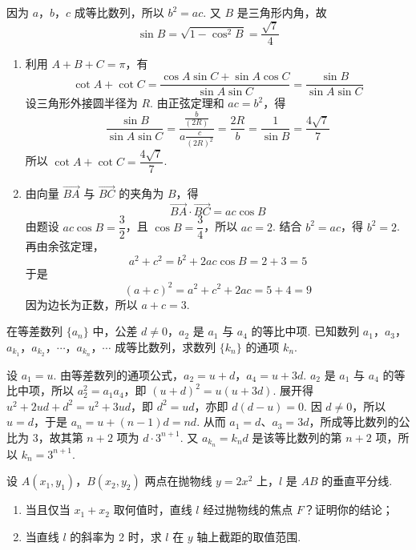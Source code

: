 \begin{solution}
因为 \(a\)，\(b\)，\(c\) 成等比数列，所以 \(b^{2}=ac\). 又 \(B\) 是三角形内角，故
\[
\sin B=\sqrt{1-\cos^{2}B}=\dfrac{\sqrt{7}}{4}
\]

\begin{enumerate}
\item 利用 \(A+B+C=\pi\)，有
\[
\cot A+\cot C=\frac{\cos A\sin C+\sin A\cos C}{\sin A\sin C}=\frac{\sin B}{\sin A\sin C}
\]
设三角形外接圆半径为 \(R\). 由正弦定理和 \(ac=b^{2}\)，得
\[
\frac{\sin B}{\sin A\sin C}
=\frac{\frac{b}{(2R)}}{a\frac{c}{(2R)^{2}}}
=\frac{2R}{b}
=\frac{1}{\sin B}
=\frac{4\sqrt{7}}{7}
\]
所以 \(\cot A+\cot C=\dfrac{4\sqrt{7}}{7}\).

\item 由向量 \(\overrightarrow{BA}\) 与 \(\overrightarrow{BC}\) 的夹角为 \(B\)，得
\[
\overrightarrow{BA}\cdot\overrightarrow{BC}=ac\cos B
\]
由题设 \(ac\cos B=\dfrac32\)，且 \(\cos B=\dfrac34\)，所以 \(ac=2\). 结合 \(b^{2}=ac\)，得 \(b^{2}=2\). 再由余弦定理，
\[
a^{2}+c^{2}=b^{2}+2ac\cos B=2+3=5
\]
于是
\[
(a+c)^{2}=a^{2}+c^{2}+2ac=5+4=9
\]
因为边长为正数，所以 \(a+c=3\).
\end{enumerate}
\end{solution}

\begin{problem}
在等差数列 \(\{a_{n}\}\) 中，公差 \(d \neq 0\)，\(a_{2}\) 是 \(a_{1}\) 与 \(a_{4}\) 的等比中项. 已知数列 \(a_{1}\)，\(a_{3}\)，\(a_{k_1}\)，\(a_{k_2}\)，\(\cdots\)，\(a_{k_n}\)，\(\cdots\) 成等比数列，求数列 \(\{k_{n}\}\) 的通项 \(k_{n}\).
\end{problem}

\begin{solution}
设 \(a_{1}=u\). 由等差数列的通项公式，\(a_{2}=u+d\)，\(a_{4}=u+3d\). \(a_2\) 是 \(a_1\) 与 \(a_4\) 的等比中项，所以 \(a_2^2=a_1a_4\)，即 \((u+d)^2=u(u+3d)\). 展开得 \(u^2+2ud+d^2=u^2+3ud\)，即 \(d^2=ud\)，亦即 \(d(d-u)=0\). 因 \(d\ne0\)，所以 \(u=d\)，于是 \(a_n=u+(n-1)d=nd\). 从而 \(a_1=d\)、\(a_3=3d\)，所成等比数列的公比为 \(3\)，故其第 \(n+2\) 项为 \(d\cdot3^{n+1}\). 又 \(a_{k_n}=k_nd\) 是该等比数列的第 \(n+2\) 项，所以 \(k_n=3^{n+1}\).
\end{solution}

\begin{problem}
设 \(A(x_{1},y_{1})\)，\(B(x_{2},y_{2})\) 两点在抛物线 \(y=2x^{2}\) 上，\(l\) 是 \(AB\) 的垂直平分线.

\begin{enumerate}
\item 当且仅当 \(x_{1} + x_{2}\) 取何值时，直线 \(l\) 经过抛物线的焦点 \(F\)？证明你的结论；
\item 当直线 \(l\) 的斜率为 2 时，求 \(l\) 在 \(y\) 轴上截距的取值范围.
\end{enumerate}
\end{problem}

